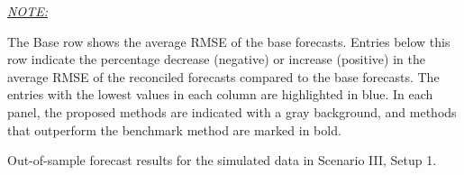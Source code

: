 \documentclass[
  12pt,
  11pt]{article}
\begin{document}
\begin{table}[!h]
{\begin{threeparttable}
\begin{tablenotes}[para]
\item \underline{\textit{NOTE:}} 
\item The Base row shows the average RMSE of the base forecasts. Entries below this row indicate the percentage decrease (negative) or increase (positive) in the average RMSE of the reconciled forecasts compared to the base forecasts. The entries with the lowest values in each column are highlighted in blue. In each panel, the proposed methods are indicated with a gray background, and methods that outperform the benchmark method are marked in bold.
\end{tablenotes}
\end{threeparttable}}
\end{table}

\hypertarget{tbl-s3-rmse}{}
\begin{table}[!h]
\caption{\label{tbl-s3-rmse}Out-of-sample forecast results for the simulated data in Scenario III,
Setup 1. }\tabularnewline


\end{table}
\end{document}
